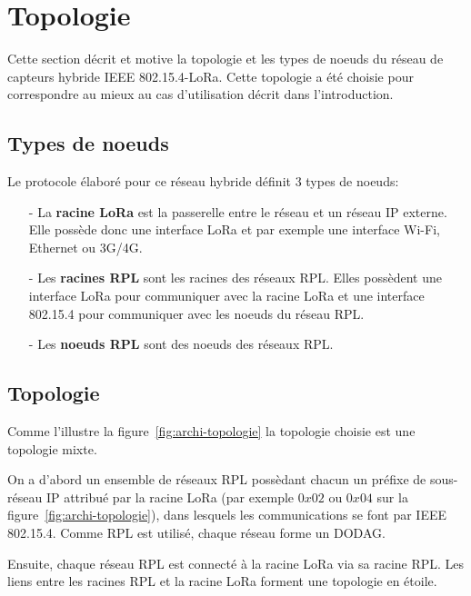 \section{Topologie}\label{sec:archi-topologie}
\renewcommand{\rightmark}{Topologie}

Cette section décrit et motive la topologie et les types de noeuds du réseau de capteurs hybride IEEE 802.15.4-LoRa. Cette topologie a été choisie pour correspondre au mieux au cas d'utilisation décrit dans l'introduction.

\subsection*{Types de noeuds}
    Le protocole élaboré pour ce réseau hybride définit 3 types de noeuds:
    \begin{itemize}
        \item[-] La \textbf{racine LoRa} est la passerelle entre le réseau et un réseau IP externe. Elle possède donc une interface LoRa et par exemple une interface Wi-Fi, Ethernet ou 3G/4G.
        \item[-] Les \textbf{racines RPL} sont les racines des réseaux RPL. Elles possèdent une interface LoRa pour communiquer avec la racine LoRa et une interface 802.15.4 pour communiquer avec les noeuds du réseau RPL.
        \item[-] Les \textbf{noeuds RPL} sont des noeuds des réseaux RPL.
    \end{itemize}

\subsection*{Topologie}
Comme l'illustre la figure~\ref{fig:archi-topologie} la topologie choisie est une topologie mixte.

On a d'abord un ensemble de réseaux RPL possèdant chacun un préfixe de sous-réseau IP attribué par la racine LoRa (par exemple $0x02$ ou $0x04$ sur la figure~\ref{fig:archi-topologie}), dans lesquels les communications se font par IEEE 802.15.4.
Comme RPL est utilisé, chaque réseau forme un DODAG.

Ensuite, chaque réseau RPL est connecté à la racine LoRa via sa racine RPL. Les liens entre les racines RPL et la racine LoRa forment une topologie en étoile.


